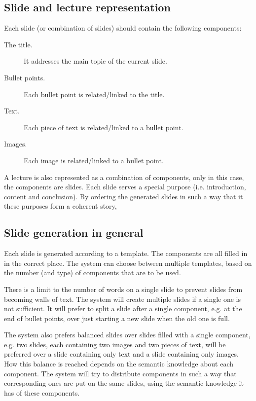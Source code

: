\documentclass[11pt]{article}
\begin{document}
\subsection{Slide and lecture representation}
Each slide (or combination of slides) should contain the following components:
\begin{description}
\item[The title.] It addresses the main topic of the current slide.
\item[Bullet points.] Each bullet point is related/linked to the title. 
\item[Text.] Each piece of text is related/linked to a bullet point.
\item[Images.] Each image is related/linked to a bullet point.
\end{description}

A lecture is also represented as a combination of components, only in this case, the components are slides. Each slide serves a special purpose (i.e. introduction, content and conclusion). By ordering the generated slides in such a way that it these purposes form a coherent story, 

\subsection{Slide generation in general}
Each slide is generated according to a template. The components are all filled in in the correct place. The system can choose between multiple templates, based on the number (and type) of components that are to be used. 

There is a limit to the number of words on a single slide to prevent slides from becoming walls of text. The system will create multiple slides if a single one is not sufficient. It will prefer to split a slide after a single component, e.g. at the end of bullet points, over just starting a new slide when the old one is full. 

The system also prefers balanced slides over slides filled with a single component, e.g. two slides, each containing two images and two pieces of text, will be preferred over a slide containing only text and a slide containing only images. How this balance is reached depends on the semantic knowledge about each component. The system will try to distribute components in such a way that corresponding ones are put on the same slides, using the semantic knowledge it has of these components. 
\end{document}
